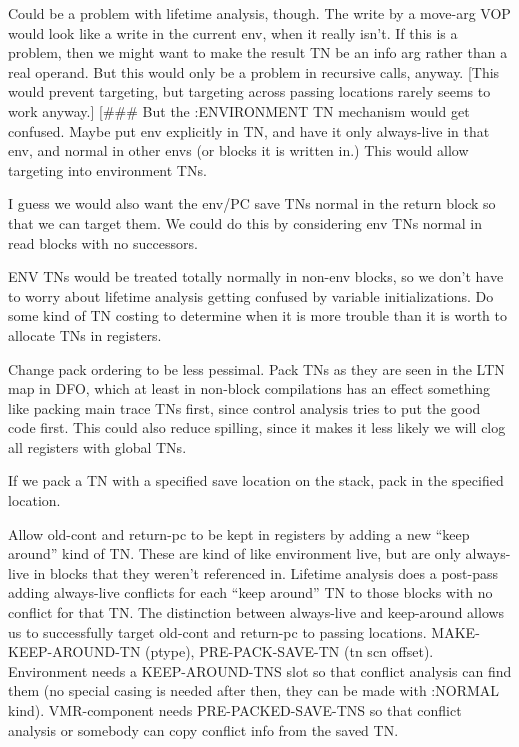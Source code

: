 Could be a problem with lifetime analysis, though.  The write by a move-arg VOP
would look like a write in the current env, when it really isn't.  If this is a
problem, then we might want to make the result TN be an info arg rather than a
real operand.  But this would only be a problem in recursive calls, anyway.
[This would prevent targeting, but targeting across passing locations rarely
seems to work anyway.]  [\#\#\# But the :ENVIRONMENT TN mechanism would get
confused.  Maybe put env explicitly in TN, and have it only always-live in that
env, and normal in other envs (or blocks it is written in.)  This would allow
targeting into environment TNs.  

I guess we would also want the env/PC save TNs normal in the return block so
that we can target them.  We could do this by considering env TNs normal in
read blocks with no successors.  

ENV TNs would be treated totally normally in non-env blocks, so we don't have
to worry about lifetime analysis getting confused by variable initializations.
Do some kind of TN costing to determine when it is more trouble than it is
worth to allocate TNs in registers.

Change pack ordering to be less pessimal.  Pack TNs as they are seen in the LTN
map in DFO, which at least in non-block compilations has an effect something
like packing main trace TNs first, since control analysis tries to put the good
code first.  This could also reduce spilling, since it makes it less likely we
will clog all registers with global TNs.

If we pack a TN with a specified save location on the stack, pack in the
specified location.

Allow old-cont and return-pc to be kept in registers by adding a new ``keep
around'' kind of TN.  These are kind of like environment live, but are only
always-live in blocks that they weren't referenced in.  Lifetime analysis does
a post-pass adding always-live conflicts for each ``keep around'' TN to those
blocks with no conflict for that TN.  The distinction between always-live and
keep-around allows us to successfully target old-cont and return-pc to passing
locations.  MAKE-KEEP-AROUND-TN (ptype), PRE-PACK-SAVE-TN (tn scn offset).
Environment needs a KEEP-AROUND-TNS slot so that conflict analysis can find
them (no special casing is needed after then, they can be made with :NORMAL
kind).  VMR-component needs PRE-PACKED-SAVE-TNS so that conflict analysis or
somebody can copy conflict info from the saved TN.



